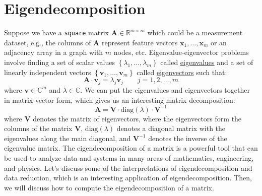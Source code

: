 \documentclass{article}[11pt]
\begin{document}

\section{Eigendecomposition}
Suppose we have a \texttt{square} matrix $\mathbf{A}\in\mathbb{R}^{m\times{m}}$ which could be a measurement dataset, e.g., the columns of $\mathbf{A}$ represent feature 
vectors $\mathbf{x}_{1},\dots,\mathbf{x}_{m}$ or an adjacency array in a graph with $m$ nodes, etc. Eigenvalue-eigenvector problems involve finding a set of scalar values $\left\{\lambda_{1},\dots,\lambda_{m}\right\}$ called 
\href{https://mathworld.wolfram.com/Eigenvalue.html}{eigenvalues} and a set of linearly independent vectors 
$\left\{\mathbf{v}_{1},\dots,\mathbf{v}_{m}\right\}$ called \href{https://mathworld.wolfram.com/Eigenvector.html}{eigenvectors} such that:
\begin{equation}
\mathbf{A}\cdot\mathbf{v}_{j} = \lambda_{j}\mathbf{v}_{j}\qquad{j=1,2,\dots,m}
\end{equation}
where $\mathbf{v}\in\mathbb{C}^{m}$ and $\lambda\in\mathbb{C}$. We can put the eigenvalues and eigenvectors together in matrix-vector form, which gives us an interesting matrix decomposition:
\begin{equation}
\mathbf{A} = \mathbf{V}\cdot\text{diag}(\lambda)\cdot\mathbf{V}^{-1}
\end{equation}
where $\mathbf{V}$ denotes the matrix of eigenvectors, where the eigenvectors form the columns of the matrix $\mathbf{V}$, $\text{diag}(\lambda)$ denotes a diagonal matrix with the eigenvalues along the main diagonal, 
and $\mathbf{V}^{-1}$ denotes the inverse of the eigenvalue matrix.
The eigendecomposition of a matrix is a powerful tool that can be used to analyze data and systems in many areas of mathematics, engineering, and physics.
Let's discuss some of the interpretations of eigendecomposition and data reduction, which is an interesting application of eigendecomposition. Then, we will discuss how to compute the eigendecomposition of a matrix.
\end{document}
